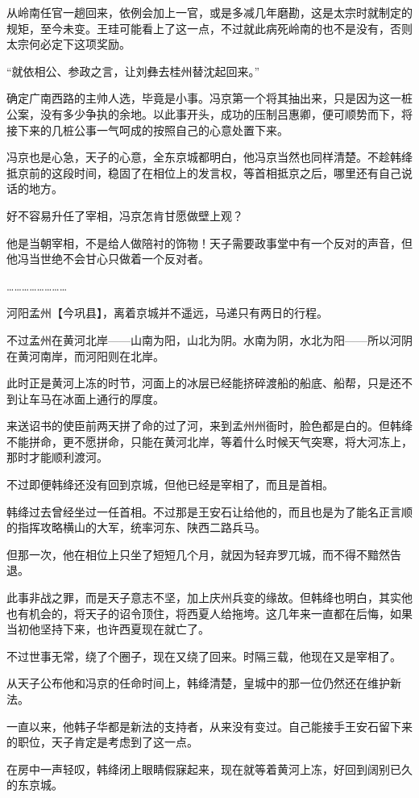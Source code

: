 从岭南任官一趟回来，依例会加上一官，或是多减几年磨勘，这是太宗时就制定的规矩，至今未变。王珪可能看上了这一点，不过就此病死岭南的也不是没有，否则太宗何必定下这项奖励。

“就依相公、参政之言，让刘彝去桂州替沈起回来。”

确定广南西路的主帅人选，毕竟是小事。冯京第一个将其抽出来，只是因为这一桩公案，没有多少争执的余地。以此事开头，成功的压制吕惠卿，便可顺势而下，将接下来的几桩公事一气呵成的按照自己的心意处置下来。

冯京也是心急，天子的心意，全东京城都明白，他冯京当然也同样清楚。不趁韩绛抵京前的这段时间，稳固了在相位上的发言权，等首相抵京之后，哪里还有自己说话的地方。

好不容易升任了宰相，冯京怎肯甘愿做壁上观？

他是当朝宰相，不是给人做陪衬的饰物！天子需要政事堂中有一个反对的声音，但他冯当世绝不会甘心只做着一个反对者。

……………………

河阳孟州【今巩县】，离着京城并不遥远，马递只有两日的行程。

不过孟州在黄河北岸——山南为阳，山北为阴。水南为阴，水北为阳——所以河阴在黄河南岸，而河阳则在北岸。

此时正是黄河上冻的时节，河面上的冰层已经能挤碎渡船的船底、船帮，只是还不到让车马在冰面上通行的厚度。

来送诏书的使臣前两天拼了命的过了河，来到孟州州衙时，脸色都是白的。但韩绛不能拼命，更不愿拼命，只能在黄河北岸，等着什么时候天气突寒，将大河冻上，那时才能顺利渡河。

不过即便韩绛还没有回到京城，但他已经是宰相了，而且是首相。

韩绛过去曾经坐过一任首相。不过那是王安石让给他的，而且也是为了能名正言顺的指挥攻略横山的大军，统率河东、陕西二路兵马。

但那一次，他在相位上只坐了短短几个月，就因为轻弃罗兀城，而不得不黯然告退。

此事非战之罪，而是天子意志不坚，加上庆州兵变的缘故。但韩绛也明白，其实他也有机会的，将天子的诏令顶住，将西夏人给拖垮。这几年来一直都在后悔，如果当初他坚持下来，也许西夏现在就亡了。

不过世事无常，绕了个圈子，现在又绕了回来。时隔三载，他现在又是宰相了。

从天子公布他和冯京的任命时间上，韩绛清楚，皇城中的那一位仍然还在维护新法。

一直以来，他韩子华都是新法的支持者，从来没有变过。自己能接手王安石留下来的职位，天子肯定是考虑到了这一点。

在房中一声轻叹，韩绛闭上眼睛假寐起来，现在就等着黄河上冻，好回到阔别已久的东京城。

